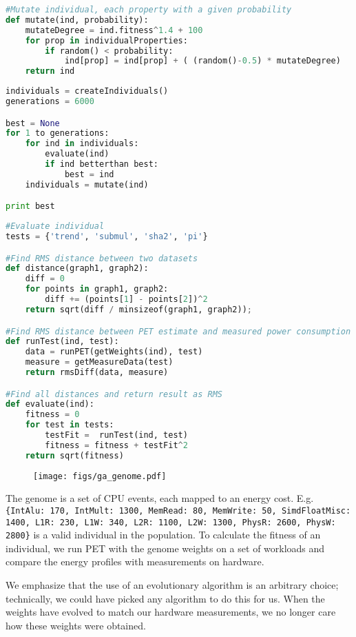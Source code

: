 \begin{lstlisting}[caption={Algorithm used to mutate individuals},label={lst:ga-mutate-algorithm},language=python,float]
#Mutate individual, each property with a given probability
def mutate(ind, probability):
    mutateDegree = ind.fitness^1.4 + 100
    for prop in individualProperties:
        if random() < probability:
            ind[prop] = ind[prop] + ( (random()-0.5) * mutateDegree)
    return ind
\end{lstlisting}

\begin{lstlisting}[caption={Algorithm used to evolve a set of event weights},label={lst:ga-algorithm},language=python,float]
individuals = createIndividuals()
generations = 6000

best = None
for 1 to generations:
    for ind in individuals:
        evaluate(ind)
        if ind betterthan best:
            best = ind
    individuals = mutate(ind)

print best
\end{lstlisting}

\begin{lstlisting}[caption={Algorithm used to evaluate an individual},label={lst:ga-eval-algorithm},language=python,float]
#Evaluate individual
tests = {'trend', 'submul', 'sha2', 'pi'}

#Find RMS distance between two datasets
def distance(graph1, graph2):
    diff = 0
    for points in graph1, graph2:
        diff += (points[1] - points[2])^2
    return sqrt(diff / minsizeof(graph1, graph2));

#Find RMS distance between PET estimate and measured power consumption
def runTest(ind, test):
    data = runPET(getWeights(ind), test)
    measure = getMeasureData(test)
    return rmsDiff(data, measure)

#Find all distances and return result as RMS
def evaluate(ind):
    fitness = 0
    for test in tests:
        testFit =  runTest(ind, test)
        fitness = fitness + testFit^2
    return sqrt(fitness)

\end{lstlisting}

\begin{figure}
    \centering
    \def\svgwidth{\columnwidth}
    \texttt{[image: figs/ga\_genome.pdf]}
\end{figure}

The genome is a set of CPU events, each mapped to an energy cost. E.g.
\texttt{\{IntAlu: 170, IntMult: 1300, MemRead: 80, MemWrite: 50, SimdFloatMisc:
1400, L1R: 230, L1W: 340, L2R: 1100, L2W: 1300, PhysR: 2600, PhysW: 2800\}} is a
valid individual in the population. To calculate the fitness of an individual,
we run PET with the genome weights on a set of workloads and compare the energy
profiles with measurements on hardware.

We emphasize that the use of an evolutionary algorithm is an arbitrary choice;
technically, we could have picked any algorithm to do this for us. When the
weights have evolved to match our hardware measurements, we no longer care how
these weights were obtained.
